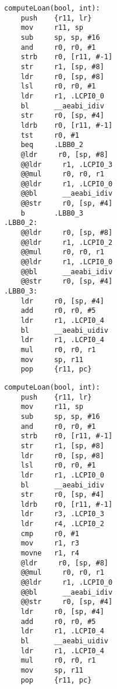 \begin{minipage}{0.45\textwidth}
    \begin{lstlisting}[style=AsmStyle, basicstyle=\fontsize{4}{5}\selectfont\ttfamily]
computeLoan(bool, int):
    push    {r11, lr}
    mov     r11, sp
    sub     sp, sp, #16
    and     r0, r0, #1
    strb    r0, [r11, #-1]
    str     r1, [sp, #8]
    ldr     r0, [sp, #8]
    lsl     r0, r0, #1
    ldr     r1, .LCPI0_0
    bl      __aeabi_idiv
    str     r0, [sp, #4]
    ldrb    r0, [r11, #-1]
    tst     r0, #1
    beq     .LBB0_2
    @ldr     r0, [sp, #8]
    @@ldr     r1, .LCPI0_3
    @@mul     r0, r0, r1
    @@ldr     r1, .LCPI0_0
    @@bl      __aeabi_idiv
    @@str     r0, [sp, #4]
    b       .LBB0_3
.LBB0_2:
    @@ldr     r0, [sp, #8]
    @@ldr     r1, .LCPI0_2
    @@mul     r0, r0, r1
    @@ldr     r1, .LCPI0_0
    @@bl      __aeabi_idiv
    @@str     r0, [sp, #4]
.LBB0_3:
    ldr     r0, [sp, #4]
    add     r0, r0, #5
    ldr     r1, .LCPI0_4
    bl      __aeabi_uidiv
    ldr     r1, .LCPI0_4
    mul     r0, r0, r1
    mov     sp, r11
    pop     {r11, pc}
    \end{lstlisting}
\end{minipage}%
\hspace{1cm}
\begin{minipage}{0.45\textwidth}
    \begin{lstlisting}[style=AsmStyle, numbers=right,  basicstyle=\fontsize{4}{5}\selectfont\ttfamily, belowskip=8.5\baselineskip]
computeLoan(bool, int):
    push    {r11, lr}
    mov     r11, sp
    sub     sp, sp, #16
    and     r0, r0, #1
    strb    r0, [r11, #-1]
    str     r1, [sp, #8]
    ldr     r0, [sp, #8]
    lsl     r0, r0, #1
    ldr     r1, .LCPI0_0
    bl      __aeabi_idiv
    str     r0, [sp, #4]
    ldrb    r0, [r11, #-1]
    ldr     r3, .LCPI0_3
    ldr     r4, .LCPI0_2
    cmp     r0, #1
    mov     r1, r3
    movne   r1, r4
    @ldr     r0, [sp, #8]
    @@mul     r0, r0, r1
    @@ldr     r1, .LCPI0_0
    @@bl      __aeabi_idiv
    @@str     r0, [sp, #4]
    ldr     r0, [sp, #4]
    add     r0, r0, #5
    ldr     r1, .LCPI0_4
    bl      __aeabi_uidiv
    ldr     r1, .LCPI0_4
    mul     r0, r0, r1
    mov     sp, r11
    pop     {r11, pc}
    \end{lstlisting}
\end{minipage}%
